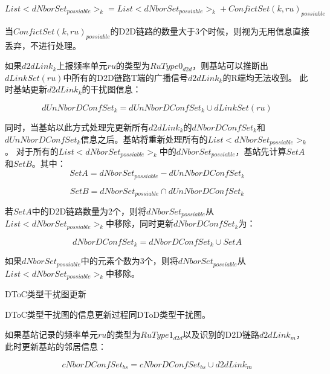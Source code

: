 \documentclass[figurelist,tablelist,algorithmlist,nomlist,masters]{seuthesix}
\begin{document}
\begin{enumerate}
		\begin{equation}\label{eq2.1}
		List < dNborSe{t_{possiable}}{ > _k} = List < dNborSe{t_{possiable}}{ > _k} + ConfictSet{(k,ru)_{possiable}}
		\end{equation}
		
		当$ConfictSet{(k,ru)_{possiable}}$的D2D链路的数量大于3个时候，则视为无用信息直接丢弃，不进行处理。
		
		
		如果$d2dLin{k_k}$上报频率单元$ru$的类型为$RuType{0_{d2d}}$，则基站可以推断出$dLinkSet(ru)$中所有的D2D链路T端的广播信号$d2dLin{k_k}$的R端均无法收到。
		此时基站更新$d2dLin{k_k}$的干扰图信息：
		
		\begin{equation}\label{eq2.1}
		dUnNborDConfSe{t_k} = dUnNborDConfSe{t_k} \cup dLinkSet(ru)
		\end{equation}
		
		同时，当基站以此方式处理完更新所有$d2dLin{k_k}$的$dNborDConfSe{t_k}$和$dUnNborDConfSe{t_k}$信息之后。基站将重新处理所有的$List < dNborSe{t_{possiable}}{ > _k}$。
		对于所有的$List < dNborSe{t_{possiable}}{ > _k}$中的$dNborSe{t_{possiable}}$，基站先计算$SetA$和$SetB$。其中：
		\begin{equation}\label{eq2.1}
		SetA = dNborSe{t_{possiable}} - dUnNborDConfSe{t_k}
		\end{equation}
		
		\begin{equation}\label{eq2.1}
		SetB = dNborSe{t_{possiable}} \cap dUnNborDConfSe{t_k}
		\end{equation}
		
		若$SetA$中的D2D链路数量为2个，则将$dNborSe{t_{possiable}}$从$List < dNborSe{t_{possiable}}{ > _k}$中移除，同时更新$dNborDConfSe{t_k}$为：
		
		\begin{equation}\label{eq2.1}
		dNborDConfSe{t_k} = dNborDConfSe{t_k} \cup SetA
		\end{equation}
		
		如果$dNborSe{t_{possiable}}$中的元素个数为3个，则将$dNborSe{t_{possiable}}$从$List < dNborSe{t_{possiable}}{ > _k}$中移除。  
		
		
		DToC类型干扰图更新
		
		DToC类型干扰图的信息更新过程同DToD类型干扰图。
		
		如果基站记录的频率单元$ru$的类型为$RuType{1_{d2d}}$以及识别的D2D链路$d2dLin{k_m}$，此时更新基站的邻居信息：
		
		\begin{equation}\label{eq2.1}
		cNborDConfSe{t_{bs}} = cNborDConfSe{t_{bs}} \cup d2dLin{k_m}
		\end{equation}
		

\end{enumerate}
\end{document}
